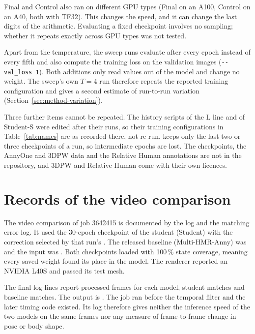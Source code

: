 Final and Control also ran on different GPU types (Final on an A100, Control on an A40, both with TF32). This changes
the speed, and it can change the last digits of the arithmetic. Evaluating a fixed checkpoint involves no sampling;
whether it repeats exactly across GPU types was not tested.

Apart from the temperature, the sweep runs evaluate after every epoch instead of every fifth and also compute the
training loss on the validation images (\texttt{-{}-val\_loss 1}). Both additions only read values out of the model
and change no weight. The sweep's own $T=4$ run therefore repeats the reported training configuration and gives a second estimate of
run-to-run variation (Section~\ref{sec:method-variation}).

Three further items cannot be repeated. The history scripts of the L line and of Student-S were edited after their
runs, so their training configurations in Table~\ref{tab:names} are as recorded there, not re-run.  keeps only the
last two or three checkpoints of a run, so intermediate epochs are lost. The checkpoints, the AnnyOne and 3DPW data
and the Relative Human annotations are not in the repository, and 3DPW and Relative Human come with their own
licences.

\section{Records of the video comparison}
\label{sec:app-video}

The video comparison of job 3642415 is documented by the log  and the matching error
log. It used the 30-epoch checkpoint of the student (Student)
with the correction selected by that run's . The released baseline (Multi-HMR-Anny) was
 and the input was . Both checkpoints loaded with
100\,\% state coverage, meaning every saved weight found its place in the model. The renderer reported an NVIDIA L40S
and passed its test mesh.

The final log lines report \VideoFrames{} processed frames for each model, \VideoStudentMatched{} student matches and
\VideoBaselineMatched{} baseline matches. The output is . The
job ran before the temporal filter and the later timing code existed. Its log therefore gives neither the inference
speed of the two models on the same frames nor any measure of frame-to-frame change in pose or body shape.

